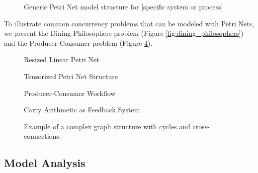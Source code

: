 \begin{figure}[htbp]
\centering

\caption{Generic Petri Net model structure for [specific system or process]}
\label{fig:petri_net_generic_model}
\end{figure}

To illustrate common concurrency problems that can be modeled with Petri Nets, we present the Dining Philosophers problem (Figure \ref{fig:dining_philosophers}) and the Producer-Consumer problem (Figure \ref{fig:producer_consumer_workflow}).

\begin{figure*}[htbp]
\centering

\caption{Petri Net model of the Dining Philosophers problem}
\label{fig:dining_philosophers}
\end{figure*}

\begin{figure}[htbp]
\centering
\resizebox{0.88\columnwidth}{!}{}
\caption{Resized Linear Petri Net}
\label{fig:linear_petri_resized}
\end{figure}

\begin{figure}[htbp]
\centering

\caption{Tensorized Petri Net Structure}
\label{fig:tensor_petri}
\end{figure}

\begin{figure}[htbp]

\caption{Producer-Consumer Workflow}
\label{fig:producer_consumer_workflow}
\end{figure}

\begin{figure}[htbp]
\centering

\caption{Carry Arithmetic as Feedback System.}
\label{fig:carry_arithmetic_feedback}
\end{figure}

\begin{figure}[htbp]
\centering
\resizebox{0.9\columnwidth}{!}{}
\caption{Example of a complex graph structure with cycles and cross-connections.}
\label{fig:complex_graph_example}
\end{figure}

\subsection{Model Analysis}

